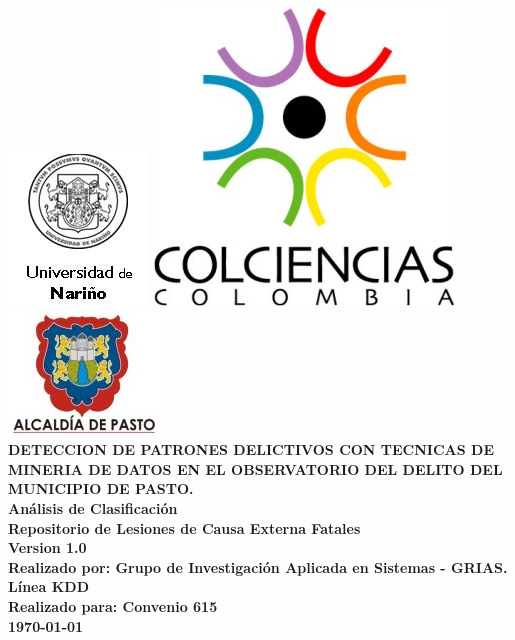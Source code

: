 \documentclass{article}
\begin{document}
\pagestyle{empty}
\hypersetup{pageanchor=false}
\begin{titlepage}
  \centering
  \vspace*{3\baselineskip}
  \includegraphics[scale=0.42]{udenar.jpg}\hspace{2cm}
  \includegraphics[scale=0.85]{colciencias.jpg}\hspace{2cm}
  \includegraphics[scale=1.2]{alcaldia.jpg} 
  \\ \vspace*{4\baselineskip}
  \large
  \bfseries
DETECCION DE PATRONES DELICTIVOS CON TECNICAS DE MINERIA DE DATOS EN EL OBSERVATORIO DEL DELITO DEL MUNICIPIO DE PASTO. \\ [5\baselineskip]
  \normalfont
  Análisis de Clasificación \\
  Repositorio de Lesiones de Causa Externa Fatales \\
  Version 1.0 \\ [5\baselineskip]
  Realizado por: Grupo de Investigación Aplicada en Sistemas - GRIAS. Línea KDD \\
  Realizado para:  Convenio 615 \\ [5\baselineskip]
  
  \textbf{\today} \\[2\baselineskip]    
\end{titlepage}

\pagestyle{plain}
\hypersetup{pageanchor=true}
\tableofcontents 
\listoffigures
\listoftables
\newpage
{}

\end{document}
